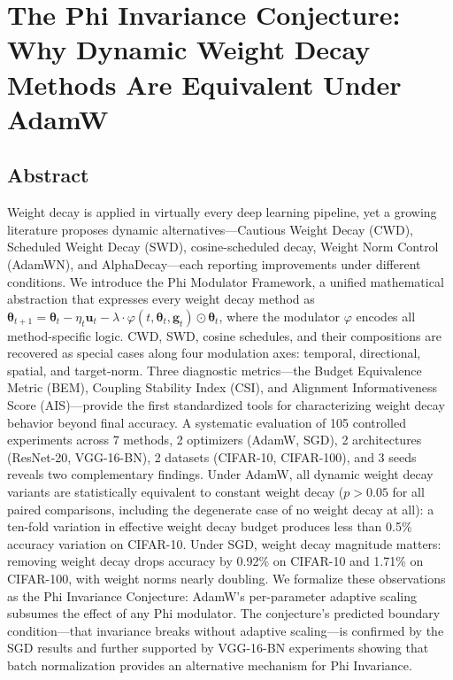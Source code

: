 \documentclass[
]{article}
\author{}
\date{}
\begin{document}
\hypertarget{the-phi-invariance-conjecture-why-dynamic-weight-decay-methods-are-equivalent-under-adamw}{%
\section{The Phi Invariance Conjecture: Why Dynamic Weight Decay Methods
Are Equivalent Under
AdamW}\label{the-phi-invariance-conjecture-why-dynamic-weight-decay-methods-are-equivalent-under-adamw}}

\hypertarget{abstract}{%
\subsection{Abstract}\label{abstract}}

Weight decay is applied in virtually every deep learning pipeline, yet a
growing literature proposes dynamic alternatives---Cautious Weight Decay
(CWD), Scheduled Weight Decay (SWD), cosine-scheduled decay, Weight Norm
Control (AdamWN), and AlphaDecay---each reporting improvements under
different conditions. We introduce the Phi Modulator Framework, a
unified mathematical abstraction that expresses every weight decay
method as
\(\boldsymbol{\theta}_{t+1} = \boldsymbol{\theta}_t - \eta_t \mathbf{u}_t - \lambda \cdot \varphi(t, \boldsymbol{\theta}_t, \mathbf{g}_t) \odot \boldsymbol{\theta}_t\),
where the modulator \(\varphi\) encodes all method-specific logic. CWD,
SWD, cosine schedules, and their compositions are recovered as special
cases along four modulation axes: temporal, directional, spatial, and
target-norm. Three diagnostic metrics---the Budget Equivalence Metric
(BEM), Coupling Stability Index (CSI), and Alignment Informativeness
Score (AIS)---provide the first standardized tools for characterizing
weight decay behavior beyond final accuracy. A systematic evaluation of
105 controlled experiments across 7 methods, 2 optimizers (AdamW, SGD),
2 architectures (ResNet-20, VGG-16-BN), 2 datasets (CIFAR-10,
CIFAR-100), and 3 seeds reveals two complementary findings. Under AdamW,
all dynamic weight decay variants are statistically equivalent to
constant weight decay (\(p > 0.05\) for all paired comparisons,
including the degenerate case of no weight decay at all): a ten-fold
variation in effective weight decay budget produces less than 0.5\%
accuracy variation on CIFAR-10. Under SGD, weight decay magnitude
matters: removing weight decay drops accuracy by 0.92\% on CIFAR-10 and
1.71\% on CIFAR-100, with weight norms nearly doubling. We formalize
these observations as the Phi Invariance Conjecture: AdamW's
per-parameter adaptive scaling subsumes the effect of any Phi modulator.
The conjecture's predicted boundary condition---that invariance breaks
without adaptive scaling---is confirmed by the SGD results and further
supported by VGG-16-BN experiments showing that batch normalization
provides an alternative mechanism for Phi Invariance.
\end{document}
